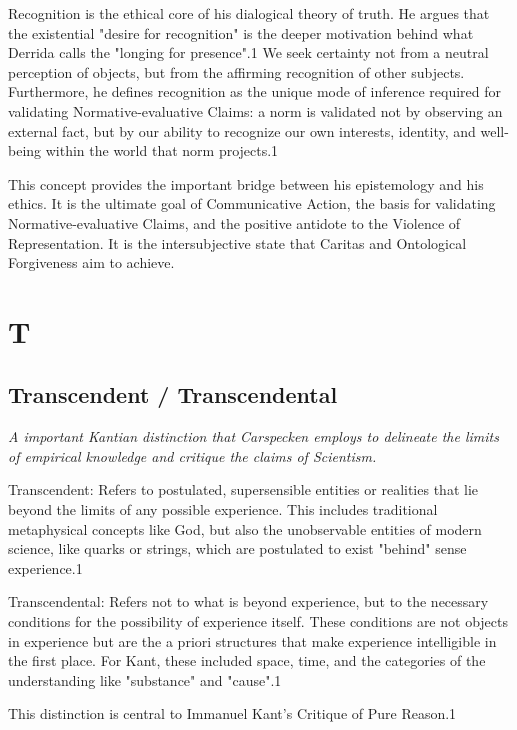 \documentclass{book}
\begin{document}
Recognition is the ethical core of his dialogical theory of truth. He argues that the existential "desire for recognition" is the deeper motivation behind what Derrida calls the "longing for presence".1 We seek certainty not from a neutral perception of objects, but from the affirming recognition of other subjects. Furthermore, he defines recognition as the unique mode of inference required for validating Normative-evaluative Claims: a norm is validated not by observing an external fact, but by our ability to recognize our own interests, identity, and well-being within the world that norm projects.1

This concept provides the important bridge between his epistemology and his ethics. It is the ultimate goal of Communicative Action, the basis for validating Normative-evaluative Claims, and the positive antidote to the Violence of Representation. It is the intersubjective state that Caritas and Ontological Forgiveness aim to achieve.

\parencite{Carspecken1999}




\chapter{T}

\section{Transcendent / Transcendental}

\textit{A important Kantian distinction that Carspecken employs to delineate the limits of empirical knowledge and critique the claims of Scientism.} 

Transcendent: Refers to postulated, supersensible entities or realities that lie beyond the limits of any possible experience. This includes traditional metaphysical concepts like God, but also the unobservable entities of modern science, like quarks or strings, which are postulated to exist "behind" sense experience.1

Transcendental: Refers not to what is beyond experience, but to the necessary conditions for the possibility of experience itself. These conditions are not objects in experience but are the a priori structures that make experience intelligible in the first place. For Kant, these included space, time, and the categories of the understanding like "substance" and "cause".1

This distinction is central to Immanuel Kant's Critique of Pure Reason.1
\end{document}
